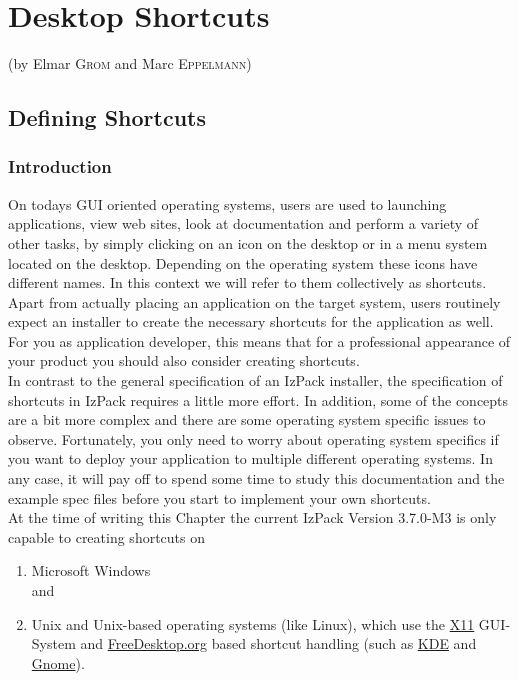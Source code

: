 

\chapter{Desktop Shortcuts} (by Elmar \textsc{Grom} and Marc \textsc{Eppelmann})\\

\section{Defining Shortcuts}

\subsection{Introduction}

On todays GUI oriented operating systems, users are used to launching
applications, view web sites, look at documentation and perform a
variety of other tasks, by simply clicking on an icon on the desktop or
in a menu system located on the desktop. Depending on the operating
system these icons have different names. In this context we will refer to
them collectively as shortcuts.\\

Apart from actually placing an application on the target system, users
routinely expect an installer to create the necessary shortcuts for the
application as well. For you as application developer, this means that
for a professional appearance of your product you should also
consider creating shortcuts.\\

In contrast to the general specification of an IzPack installer, the
specification of shortcuts in IzPack requires a little more effort. In
addition, some of the concepts are a bit more complex and there are some
operating system specific issues to observe. Fortunately, you only need
to worry about operating system specifics if you want to deploy your
application to multiple different operating systems. In any case, it
will pay off to spend some time to study this documentation and the
example spec files before you start to implement your own shortcuts.\\

At the time of writing this Chapter the current IzPack Version 3.7.0-M3 is only
capable to creating shortcuts on
\begin{enumerate}
\item Microsoft Windows\\
 and
\item Unix and Unix-based operating systems (like Linux), which use the \href{http://www.x11.org/}{X11} GUI-System and \href{http://www.freedesktop.org/}{FreeDesktop.org}
based shortcut handling (such as \href{http://www.kde.org/}{KDE} and \href{http://www.gnome.org/}{Gnome}).

\end{enumerate}

